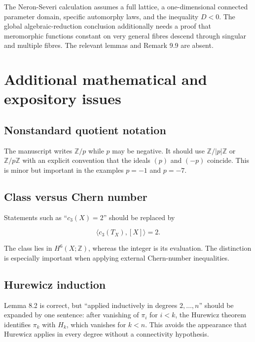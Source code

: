 \documentclass[
  10pt,
]{article}
\begin{document}
The Neron-Severi calculation assumes a full lattice, a one-dimensional
connected parameter domain, specific automorphy laws, and the inequality
\(D<0\). The global algebraic-reduction conclusion additionally needs a
proof that meromorphic functions constant on very general fibres descend
through singular and multiple fibres. The relevant lemmas and Remark 9.9
are absent.

\section{Additional mathematical and expository
issues}\label{additional-mathematical-and-expository-issues}

\subsection{Nonstandard quotient
notation}\label{nonstandard-quotient-notation}

The manuscript writes \(\mathbb Z/p\) while \(p\) may be negative. It
should use \(\mathbb Z/|p|\mathbb Z\) or \(\mathbb Z/p\mathbb Z\) with
an explicit convention that the ideals \((p)\) and \((-p)\) coincide.
This is minor but important in the examples \(p=-1\) and \(p=-7\).

\subsection{Class versus Chern number}\label{class-versus-chern-number}

Statements such as ``\(c_3(X)=2\)'' should be replaced by

\[
\langle c_3(T_X),[X]\rangle=2.
\]

The class lies in \(H^6(X;\mathbb Z)\), whereas the integer is its
evaluation. The distinction is especially important when applying
external Chern-number inequalities.

\subsection{Hurewicz induction}\label{hurewicz-induction}

Lemma 8.2 is correct, but ``applied inductively in degrees
\(2,\ldots,n\)'' should be expanded by one sentence: after vanishing of
\(\pi_i\) for \(i<k\), the Hurewicz theorem identifies \(\pi_k\) with
\(H_k\), which vanishes for \(k<n\). This avoids the appearance that
Hurewicz applies in every degree without a connectivity hypothesis.
\end{document}
